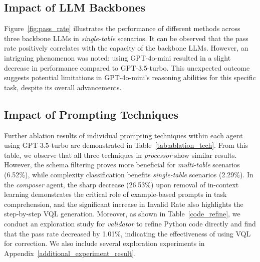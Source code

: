 \subsection{Impact of LLM Backbones}
Figure~\ref{fig:pass_rate} illustrates the performance of different methods across three backbone LLMs in \textit{single-table} scenarios.
It can be observed that the pass rate positively correlates with the capacity of the backbone LLMs.
However, an intriguing phenomenon was noted: using GPT-4o-mini resulted in a slight decrease in performance compared to GPT-3.5-turbo.
This unexpected outcome suggests potential limitations in GPT-4o-mini's reasoning abilities for this specific task, despite its overall advancements. 
\subsection{Impact of Prompting Techniques}
Further ablation results of individual prompting techniques within each agent using GPT-3.5-turbo are demonstrated in Table~\ref{tab:ablation_tech}. From this table, we observe that all three techniques in \textit{processor} show similar results. However, the schema filtering proves more beneficial for \textit{multi-table} scenarios (6.52\%), while complexity classification benefits \textit{single-table} scenarios (2.29\%). In the \textit{composer} agent, the sharp decrease (26.53\%) upon removal of in-context learning demonstrates the critical role of example-based prompts in task comprehension, and the significant increase in Invalid Rate also highlights the step-by-step VQL generation.
Moreover, as shown in Table~\ref{code_refine}, we conduct an exploration study for \textit{validator} to refine Python code directly and find that the pass rate decreased by 1.01\%, indicating the effectiveness of using VQL for correction.
We also include several exploration experiments in Appendix~\ref{additional_experiment_result}.

